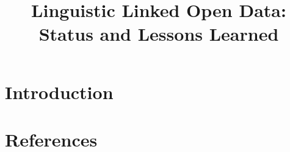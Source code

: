 \documentclass[10pt, a4paper]{article}
\title{Linguistic Linked Open Data: Status and Lessons Learned}
\begin{document}
\maketitleabstract


\section{Introduction}

\section{References}


\footnotesize

\end{document}
